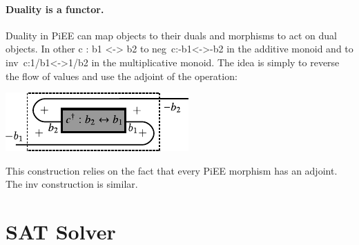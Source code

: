 \documentclass[preprint]{sigplanconf}
\newcommand{\xcomment}[2]{\textbf{#1:~\textsl{#2}}}
\newcommand{\amr}[1]{\xcomment{Amr}{#1}}
\begin{document}
\paragraph*{Duality is a functor.}
Duality in {{PiEE}} can map objects to their duals and morphisms
to act on dual objects. In other {{c : b1 <-> b2}} to
{{neg~c:-b1<->-b2}} in the additive monoid and to
{{inv~c:1/b1<->1/b2}} in the multiplicative monoid. 
The idea is simply to reverse the flow of values and use the
adjoint of the operation:
\begin{multicols}{2}
\begin{center}
  \includegraphics{diagrams/neg_lift.pdf}
\end{center}  

\end{multicols}

This construction relies on the fact that every {{PiEE}} morphism
has an adjoint.  The {{inv}} construction is similar.


\section{SAT Solver }
\label{sec:sat-solver}


\end{document}
